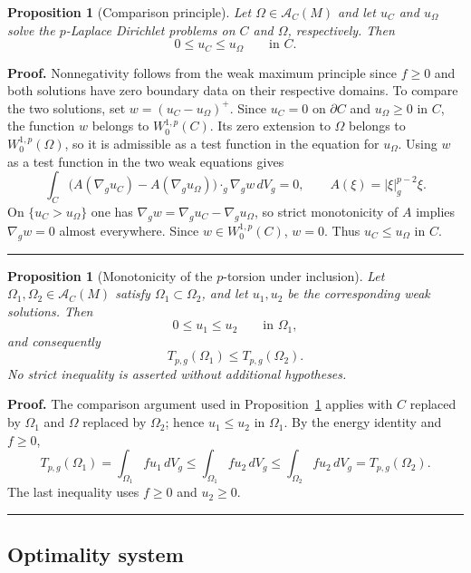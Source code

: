 \documentclass{article}
\newtheorem{proposition}[theorem]{Proposition}
\newenvironment{proof}[1][Proof]{\textbf{#1.} }{\hfill\rule{0.5em}{0.5em}}
\begin{document}
\begin{proposition}[Comparison principle]
\label{prop:comparison}
Let $\Omega\in \mathcal A_C(M)$ and let $u_C$ and $u_\Omega$ solve the
$p$-Laplace Dirichlet problems on $C$ and $\Omega$, respectively.
Then
\[
0\leq u_C\leq u_\Omega
\qquad\text{in }C.
\]
\end{proposition}

\begin{proof}
Nonnegativity follows from the weak maximum principle since $f\ge0$ and both solutions have zero boundary data on their respective domains. To compare the two solutions, set $w=(u_C-u_\Omega)^+$. Since $u_C=0$ on $\partial C$ and $u_\Omega\ge0$ in $C$, the function $w$ belongs to $W_0^{1,p}(C)$. Its zero extension to $\Omega$ belongs to $W_0^{1,p}(\Omega)$, so it is admissible as a test function in the equation for $u_\Omega$. Using $w$ as a test function in the two weak equations gives
\[
\int_C\bigl(A(\nabla_g u_C)-A(\nabla_g u_\Omega)\bigr)\cdot_g\nabla_g w\,dV_g=0,
\qquad A(\xi)=|\xi|_g^{p-2}\xi.
\]
On $\{u_C>u_\Omega\}$ one has $\nabla_gw=\nabla_g u_C-\nabla_g u_\Omega$, so strict monotonicity of $A$ implies $\nabla_gw=0$ almost everywhere. Since $w\in W_0^{1,p}(C)$, $w=0$. Thus $u_C\le u_\Omega$ in $C$.\end{proof}

\begin{proposition}[Monotonicity of the $p$-torsion under inclusion]
\label{prop:torsion-monotonicity}
Let $\Omega_1,\Omega_2\in\mathcal A_C(M)$ satisfy
$\Omega_1\subset\Omega_2$, and let $u_1,u_2$ be the corresponding
weak solutions. Then
\[
0\le u_1\le u_2\qquad\text{in }\Omega_1,
\]
and consequently
\[
T_{p,g}(\Omega_1)\le T_{p,g}(\Omega_2).
\]
No strict inequality is asserted without additional hypotheses.
\end{proposition}

\begin{proof}
The comparison argument used in Proposition~\ref{prop:comparison} applies
with $C$ replaced by $\Omega_1$ and $\Omega$ replaced by $\Omega_2$; hence
$u_1\le u_2$ in $\Omega_1$. By the energy identity and $f\ge0$,
\[
T_{p,g}(\Omega_1)
=\int_{\Omega_1}fu_1\,dV_g
\le\int_{\Omega_1}fu_2\,dV_g
\le\int_{\Omega_2}fu_2\,dV_g
=T_{p,g}(\Omega_2).
\]
The last inequality uses $f\ge0$ and $u_2\ge0$.\end{proof}

\subsection{Optimality system}
\end{document}
